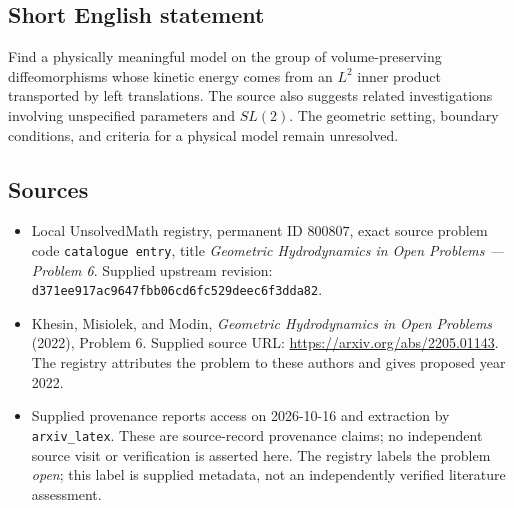 \documentclass[11pt]{article}
\begin{document}
\subsection{Short English statement}
Find a physically meaningful model on the group of volume-preserving diffeomorphisms whose kinetic energy comes from an \(L^2\) inner product transported by left translations. The source also suggests related investigations involving unspecified parameters and \(SL(2)\). The geometric setting, boundary conditions, and criteria for a physical model remain unresolved.
\subsection{Sources}
\begin{itemize}
\item Local UnsolvedMath registry, permanent ID \(800807\), exact source problem code \texttt{catalogue entry}, title \emph{Geometric Hydrodynamics in Open Problems --- Problem 6}. Supplied upstream revision: \texttt{d371ee917ac9647fbb06cd6fc529deec6f3dda82}.
\item Khesin, Misiolek, and Modin, \emph{Geometric Hydrodynamics in Open Problems} (2022), Problem 6. Supplied source URL: \url{https://arxiv.org/abs/2205.01143}. The registry attributes the problem to these authors and gives proposed year 2022.
\item Supplied provenance reports access on 2026-10-16 and extraction by \texttt{arxiv\_latex}. These are source-record provenance claims; no independent source visit or verification is asserted here. The registry labels the problem \emph{open}; this label is supplied metadata, not an independently verified literature assessment.
\end{itemize}
\end{document}
